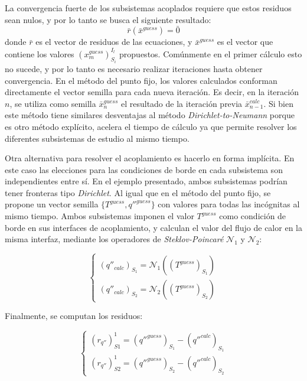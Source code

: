 La convergencia fuerte de los subsistemas acoplados requiere que estos residuos sean nulos, y por lo tanto se busca el siguiente resultado:
\begin{equation}
\bar{r}(\bar{x}^{guess})=\bar{0}
\label{sistema-simple}
\end{equation}
donde $\bar{r}$ es el vector de residuos de las ecuaciones,
y $\bar{x}^{guess}$ es el vector que contiene los valores $(x_m^{guess})_{S_i}^{I_l}$ propuestos.
Comúnmente en el primer cálculo esto no sucede, y por lo tanto es necesario realizar iteraciones hasta obtener convergencia.
En el método del punto fijo, los valores calculados conforman directamente el vector semilla para cada nueva iteración.
Es decir, en la iteración $n$, se utiliza como semilla $\bar{x}^{guess}_n$ el resultado de la iteración previa $\bar{x}^{calc}_{n-1}$.
Si bien este método tiene similares desventajas al método \textit{Dirichlet-to-Neumann} porque es otro método explícito,
acelera el tiempo de cálculo ya que permite resolver los diferentes subsistemas de estudio al mismo tiempo.

Otra alternativa para resolver el acoplamiento es hacerlo en forma implícita.
En este caso las elecciones para las condiciones de borde en cada subsistema son independientes entre sí.
En el ejemplo presentado, ambos subsistemas podrían tener fronteras tipo \textit{Dirichlet}.
Al igual que en el método del punto fijo, se propone un vector semilla $\{T^{guess},q''^{guess}\}$ con valores para todas las incógnitas al mismo tiempo.
Ambos subsistemas imponen el valor $T^{guess}$ como condición de borde en sus interfaces de acoplamiento,
y calculan el valor del flujo de calor en la misma interfaz, mediante los operadores de \textit{Steklov-Poincaré} $\mathscr{N}_1$ y $\mathscr{N}_2$:

\begin{equation}
\left\{\begin{matrix}
(q''_{calc})_{S_1}  = \mathscr{N}_1\left ((T^{guess})_{S_1}\right ) \\
(q''_{calc})_{S_2}  = \mathscr{N}_2\left ((T^{guess})_{S_2}\right )
\end{matrix}\right.
\label{qq_nn_tt}
\end{equation}

Finalmente, se computan los residuos:

\begin{equation}
\left\{\begin{matrix}
(r_{q''})_{S1}^{1}  = (q''^{ guess})_{S_1} - (q''^{calc})_{S_1} \\
(r_{q''})_{S2}^{1}  = (q''^{ guess})_{S_2} - (q''^{calc})_{S_2}
\end{matrix}\right.
\label{res_qq}
\end{equation}

